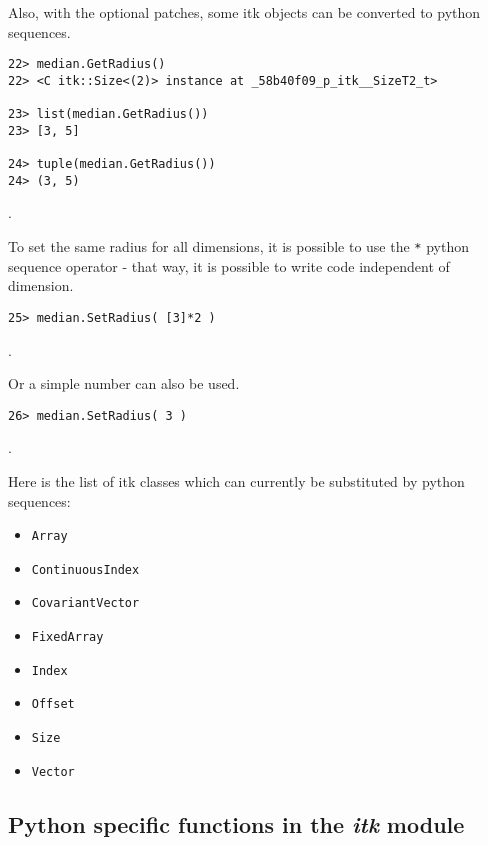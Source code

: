 \documentclass{InsightArticle}
\begin{document}
Also, with the optional patches, some itk objects can be converted to python sequences.

\begin{verbatim}
22> median.GetRadius()
22> <C itk::Size<(2)> instance at _58b40f09_p_itk__SizeT2_t>

23> list(median.GetRadius())
23> [3, 5]

24> tuple(median.GetRadius())
24> (3, 5)
\end{verbatim}.

To set the same radius for all dimensions, it is possible to use the \verb$*$ python
sequence operator - that way, it is possible to write code independent of dimension.

\begin{verbatim}
25> median.SetRadius( [3]*2 )
\end{verbatim}.

Or a simple number can also be used.

\begin{verbatim}
26> median.SetRadius( 3 )
\end{verbatim}.

Here is the list of itk classes which can currently be substituted by python sequences:
\begin{itemize}
  \item \verb$Array$
  \item \verb$ContinuousIndex$
  \item \verb$CovariantVector$
  \item \verb$FixedArray$
  \item \verb$Index$
  \item \verb$Offset$
  \item \verb$Size$
  \item \verb$Vector$
\end{itemize}

     \subsection{Python specific functions in the {\em itk} module}
\end{document}
